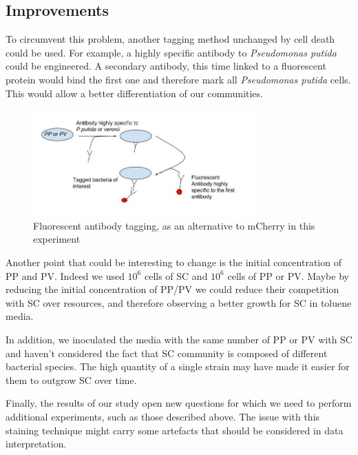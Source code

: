 \documentclass[a4paper, 10pt, conference]{ieeeconf}   %
\begin{document}
\subsection{Improvements}

To circumvent this problem, another tagging method unchanged by cell death could be used. For example, a highly specific antibody to \textit{Pseudomonas putida} could be engineered. A secondary antibody, this time linked to a fluorescent protein would bind the first one and therefore mark all \textit{Pseudomonas putida} cells. This would allow a better differentiation of our communities.
\begin{figure}[H]
	\centering
	
	\includegraphics[width=8.5cm]{antibodytag.jpg}
	\caption{Fluorescent antibody tagging, as an alternative to mCherry in this experiment}
	\label{antibody}
	
\end{figure}
Another point that could be interesting to change is the initial concentration of PP and PV. Indeed we used $10^{6}$ cells of SC and $10^{6}$ cells of PP or PV. Maybe by reducing the initial concentration of PP/PV we could reduce their competition with SC over resources, and therefore observing a better growth for SC in toluene media. 

In addition, we inoculated the media with the same number of PP or PV with SC and haven't considered the fact that SC community is composed of different bacterial species.
The high quantity of a single strain may have made it easier for them  to outgrow SC over time. 


Finally, the results of our study open new questions for which we need to perform additional experiments, such as those described above. The issue with this staining technique might carry some artefacts that should be considered in data interpretation.
\end{document}
